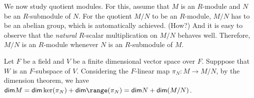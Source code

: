 We now study quotient modules.
For this, assume that $M$ is an $R$-module and $N$ be an $R$-submodule of $N$.
For the quotient $M/N$ to be an $R$-module, $M/N$ has to be an abelian group, which is automatically achieved. \color{brown}(How?) \color{black}
And it is easy to observe that the \textit{natural} $R$-scalar multiplication on $M/N$ behaves well.
Therefore, $M/N$ is an $R$-module whenever $N$ is an $R$-submodule of $M$.

\begin{exmp}
    Let $F$ be a field and $V$ be a finite dimensional vector space over $F$.
    Supppose that $W$ is an $F$-subspace of $V$.
    Considering the $F$-linear map $\pi_N: M\rightarrow M/N$, by the dimension theorem, we have $\textsf{dim}M = \textsf{dim}\ker(\pi_N) + \textsf{dim}\range(\pi_N)=\textsf{dim}N+\textsf{dim}(M/N)$.
\end{exmp}